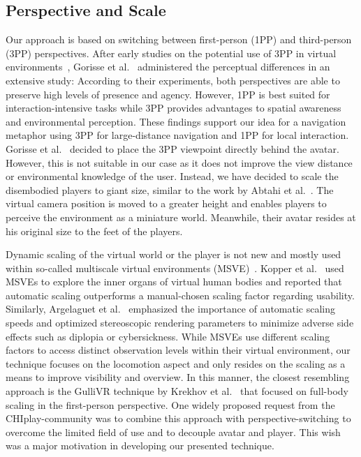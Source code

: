 \documentclass{sigchi}
\newcommand{\comm}[1]{}
\begin{document}
\subsection{Perspective and Scale}
Our approach is based on switching between first-person (1PP) and third-person (3PP) perspectives. After early studies on the potential use of 3PP in virtual environments~\cite{salamin2006benefits}, Gorisse et al.~\cite{gorisse2017first} administered the perceptual differences in an extensive study: According to their experiments, both perspectives are able to preserve high levels of presence and agency. However, 1PP is best suited for interaction-intensive tasks\comm{ and scenarios involving body ownership. In contrast,} while 3PP provides advantages to spatial awareness and environmental perception. These findings support our idea for a navigation metaphor using 3PP for large-distance navigation and 1PP for local interaction. Gorisse et al.~\cite{gorisse2017first} decided to place the 3PP viewpoint directly behind the avatar. However, this is not suitable in our case as it does not improve the view distance or environmental knowledge of the user. Instead, we have decided to scale the disembodied players to giant size, similar to the work by Abtahi et al.~\cite{abtahi2019m}. The virtual camera position is moved to a greater height and enables players to perceive the environment as a miniature world. Meanwhile, their avatar resides at his original size to the feet of the players.\par
Dynamic scaling of the virtual world or the player is not new and mostly used within so-called multiscale virtual environments (MSVE)~\cite{Zhang:2002:SIM:571878.571884}. Kopper et al.~\cite{kopper2006design} used MSVEs to explore the inner organs of virtual human bodies and reported that automatic scaling outperforms a manual-chosen scaling factor regarding usability. Similarly, Argelaguet et al.~\cite{argelaguet2016giant} emphasized the importance of automatic scaling speeds and optimized stereoscopic rendering parameters to minimize adverse side effects such as diplopia or cybersickness. While MSVEs use different scaling factors to access distinct observation levels within their virtual environment, our technique focuses on the locomotion aspect and only resides on the scaling as a means to improve visibility and overview. In this manner, the closest resembling approach is the GulliVR technique by Krekhov et al.~\cite{krekhov2018gullivr} that focused on full-body scaling in the first-person perspective. One widely proposed request from the CHIplay-community was to combine this approach with perspective-switching to overcome the limited field of use and to decouple avatar and player. This wish was a major motivation in developing our presented technique.\par
\end{document}

